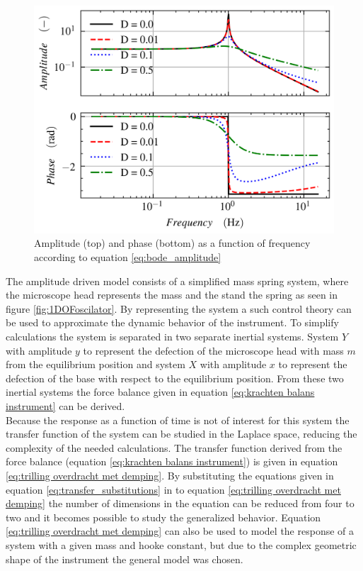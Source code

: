 \documentclass[10pt]{article}
\begin{document}
\begin{figure}[H]
\begin{minipage}[b]{0.65\textwidth}
    \includegraphics[width=\textwidth]{img/resonance/1dof_oscillator_without_damping.png}
    \caption{Amplitude (top) and phase (bottom) as a function of frequency according to equation \ref{eq:bode_amplitude}}
    \label{fig:amp_driven_bode}
  \end{minipage}
\end{figure}

The amplitude driven model consists of a simplified mass spring system, where the microscope head represents the mass and the stand the spring as seen in figure \ref{fig:1DOFoscilator}.
By representing the system a such control theory can be used to approximate the dynamic behavior of the instrument. 
To simplify calculations the system is separated in two separate inertial systems.
System $Y$ with amplitude $y$ to represent the defection of the microscope head with mass $m$ from the equilibrium position and system $X$ with amplitude $x$ to represent the defection of the base with respect to the equilibrium position.
From these two inertial systems the force balance given in equation \ref{eq:krachten balans instrument} can be derived.\\
 
Because the response as a function of time is not of interest for this system the transfer function of the system can be studied in the Laplace space, reducing the complexity of the needed calculations.
The transfer function derived from the force balance (equation \ref{eq:krachten balans instrument}) is given in equation \ref{eq:trilling overdracht met demping}.
By substituting the equations given in equation \ref{eq:transfer_substitutions} in to equation \ref{eq:trilling overdracht met demping} the number of dimensions in the equation can be reduced from four to two and it becomes possible to study the generalized behavior.
Equation \ref{eq:trilling overdracht met demping} can also be used to model the response of a system with a given mass and hooke constant, but due to the complex geometric shape of the instrument the general model was chosen.
\end{document}
